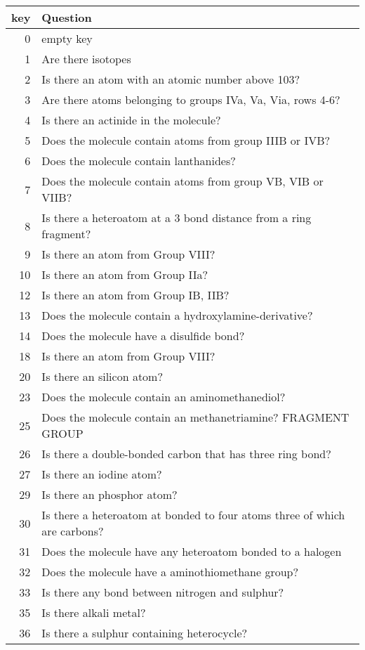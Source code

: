 \begin{tabular}{rl}
\toprule
key & Question \\
\midrule
0 &  empty key \\
1 &  Are there isotopes  \\
2 &  Is there an atom with an atomic number above 103?   \\
3 &  Are there atoms belonging to groups IVa, Va, Via, rows 4-6?  \\
4 &  Is there an actinide in the molecule?   \\
5 &  Does the molecule contain atoms from group IIIB or IVB?  \\
6 &  Does the molecule contain lanthanides?  \\
7 &  Does the molecule contain atoms from group VB, VIB or VIIB?  \\
8 &  Is there a heteroatom at a 3 bond distance from a ring fragment?   \\
9 &  Is there an atom from Group VIII?  \\
10 &  Is there an atom from Group IIa?  \\
12 &  Is there an atom from Group IB, IIB?  \\
13 &  Does the molecule contain a hydroxylamine-derivative?  \\
14 &  Does the molecule have a disulfide bond?   \\
18 &  Is there an atom from Group VIII?  \\
20 &  Is there an silicon atom?  \\
23 &  Does the molecule contain an aminomethanediol?  \\
25 &  Does the molecule contain an methanetriamine? FRAGMENT GROUP  \\
26 &  Is there a double-bonded carbon that has three ring bond?   \\
27 &  Is there an iodine atom?  \\
29 &  Is there an phosphor atom?  \\
30 &  Is there a heteroatom at bonded to four atoms three of which are carbons?   \\
31 &  Does the molecule have any heteroatom bonded to a halogen   \\
32 &  Does the molecule have a aminothiomethane group?   \\
33 &  Is there any bond between nitrogen and sulphur?   \\
35 &  Is there alkali metal?  \\
36 &  Is there a sulphur containing heterocycle?  \\

\end{tabular}
